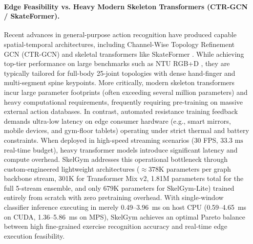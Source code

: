 \documentclass[runningheads]{llncs}
\begin{document}
\paragraph{Edge Feasibility vs. Heavy Modern Skeleton Transformers (CTR-GCN / SkateFormer).}
Recent advances in general-purpose action recognition have produced capable spatial-temporal architectures, including Channel-Wise Topology Refinement GCN (CTR-GCN) \cite{chen2021channel} and skeletal transformers like SkateFormer \cite{zheng2024skateformer}. While achieving top-tier performance on large benchmarks such as NTU RGB+D \cite{shahroudy2016}, they are typically tailored for full-body 25-joint topologies with dense hand-finger and multi-segment spine keypoints. More critically, modern skeleton transformers incur large parameter footprints (often exceeding several million parameters) and heavy computational requirements, frequently requiring pre-training on massive external action databases.
In contrast, automated resistance training feedback demands ultra-low latency on edge consumer hardware (e.g., smart mirrors, mobile devices, and gym-floor tablets) operating under strict thermal and battery constraints. When deployed in high-speed streaming scenarios (30 FPS, $33.3\text{ ms}$ real-time budget), heavy transformer models introduce significant latency and compute overhead. SkelGym addresses this operational bottleneck through custom-engineered lightweight architectures ($\approx 378\text{K}$ parameters per graph backbone stream, 301K for Transformer Mix v2, 1.81M parameters total for the full 5-stream ensemble, and only 679K parameters for SkelGym-Lite) trained entirely from scratch with zero pretraining overhead. With single-window classifier inference executing in merely 0.49--3.96~ms on host CPU (0.59--4.65~ms on CUDA, 1.36--5.86~ms on MPS), SkelGym achieves an optimal Pareto balance between high fine-grained exercise recognition accuracy and real-time edge execution feasibility.
\end{document}
